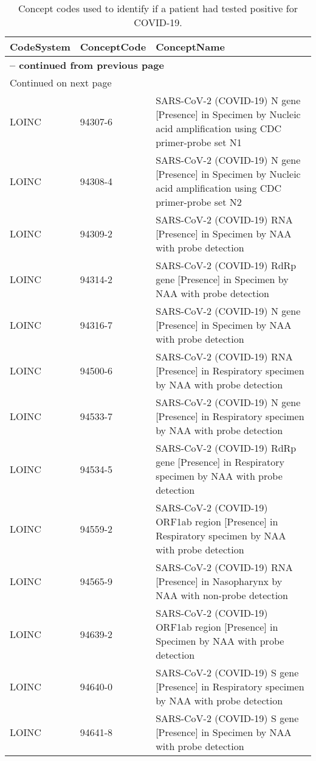 \begin{longtable}{p{}p{}p{}}
\caption{Concept codes used to identify if a patient had tested positive for COVID-19.} \\ 
 CodeSystem & ConceptCode & ConceptName \\ 
  \hline 
\endfirsthead 
\multicolumn{3}{p{\textwidth}}{{ \bfseries \tablename \thetable{} -- continued from previous page}} \ 
\hline CodeSystem & ConceptCode & ConceptName \\ \hline 
\endhead 
\hline \multicolumn{3}{p{\textwidth}}{{Continued on next page}} \\ \hline 
\endfoot 
\hline 
\endlastfoot 
 \hline
LOINC & 94307-6 & SARS-CoV-2 (COVID-19) N gene [Presence] in Specimen by Nucleic acid amplification using CDC primer-probe set N1 \\ 
  LOINC & 94308-4 & SARS-CoV-2 (COVID-19) N gene [Presence] in Specimen by Nucleic acid amplification using CDC primer-probe set N2 \\ 
  LOINC & 94309-2 & SARS-CoV-2 (COVID-19) RNA [Presence] in Specimen by NAA with probe detection \\ 
  LOINC & 94314-2 & SARS-CoV-2 (COVID-19) RdRp gene [Presence] in Specimen by NAA with probe detection \\ 
  LOINC & 94316-7 & SARS-CoV-2 (COVID-19) N gene [Presence] in Specimen by NAA with probe detection \\ 
  LOINC & 94500-6 & SARS-CoV-2 (COVID-19) RNA [Presence] in Respiratory specimen by NAA with probe detection \\ 
  LOINC & 94533-7 & SARS-CoV-2 (COVID-19) N gene [Presence] in Respiratory specimen by NAA with probe detection \\ 
  LOINC & 94534-5 & SARS-CoV-2 (COVID-19) RdRp gene [Presence] in Respiratory specimen by NAA with probe detection \\ 
  LOINC & 94559-2 & SARS-CoV-2 (COVID-19) ORF1ab region [Presence] in Respiratory specimen by NAA with probe detection \\ 
  LOINC & 94565-9 & SARS-CoV-2 (COVID-19) RNA [Presence] in Nasopharynx by NAA with non-probe detection \\ 
  LOINC & 94639-2 & SARS-CoV-2 (COVID-19) ORF1ab region [Presence] in Specimen by NAA with probe detection \\ 
  LOINC & 94640-0 & SARS-CoV-2 (COVID-19) S gene [Presence] in Respiratory specimen by NAA with probe detection \\ 
  LOINC & 94641-8 & SARS-CoV-2 (COVID-19) S gene [Presence] in Specimen by NAA with probe detection \\ 

\end{longtable}
